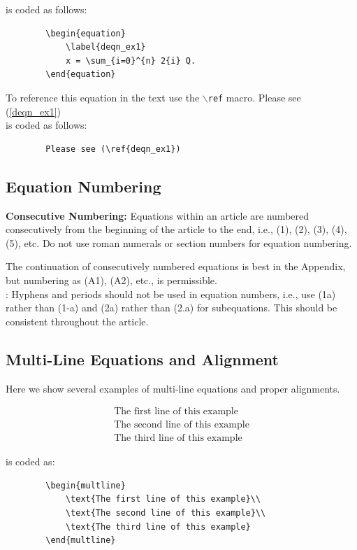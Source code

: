 \documentclass[lettersize,journal]{IEEEtran}
\begin{document}
	\noindent is coded as follows:
	\begin{verbatim}
		\begin{equation}
			\label{deqn_ex1}
			x = \sum_{i=0}^{n} 2{i} Q.
		\end{equation}
	\end{verbatim}
	
	To reference this equation in the text use the $\backslash${\tt{ref}} macro. 
	Please see (\ref{deqn_ex1})\\
	\noindent is coded as follows:
	\begin{verbatim}
		Please see (\ref{deqn_ex1})\end{verbatim}
	
	\subsection{Equation Numbering}
	{\bf{Consecutive Numbering:}} Equations within an article are numbered consecutively from the beginning of the
	article to the end, i.e., (1), (2), (3), (4), (5), etc. Do not use roman numerals or section numbers for equation numbering.
	
	 The continuation of consecutively numbered equations is best in the Appendix, but numbering
	as (A1), (A2), etc., is permissible.\\
	
	: Hyphens and periods should not be used in equation numbers, i.e., use (1a) rather than
	(1-a) and (2a) rather than (2.a) for subequations. This should be consistent throughout the article.
	
	\subsection{Multi-Line Equations and Alignment}
	Here we show several examples of multi-line equations and proper alignments.
	
	\begin{multline}
		\text{The first line of this example}\\
		\text{The second line of this example}\\
		\text{The third line of this example}
	\end{multline}
	
	\noindent is coded as:
	\begin{verbatim}
		\begin{multline}
			\text{The first line of this example}\\
			\text{The second line of this example}\\
			\text{The third line of this example}
		\end{multline}
	\end{verbatim}
	
\end{document}

